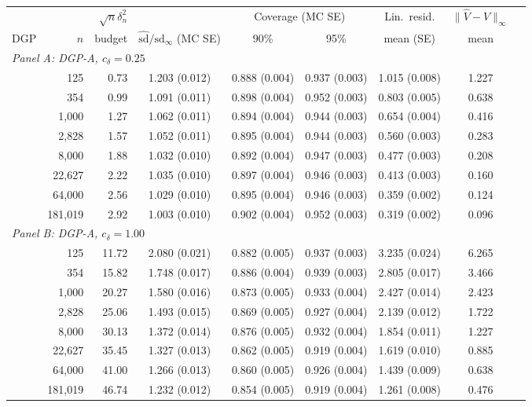 \begin{tabular}{lrrcccccc}
\toprule
 & & $\sqrt n\delta_n^2$ & & \multicolumn{2}{c}{Coverage (MC SE)} & Lin.\ resid. & $\|\hat V-V\|_\infty$ \\
\cmidrule(lr){5-6}
DGP & $n$ & budget & $\hat{\mathrm{sd}}/\mathrm{sd}_\infty$ (MC SE) & 90\% & 95\% & mean (SE) & mean \\
\midrule
\multicolumn{8}{l}{\textit{Panel A: DGP-A, $c_\delta=0.25$}} \\
\midrule
& 125 & 0.73 & 1.203 (0.012) & 0.888 (0.004) & 0.937 (0.003) & 1.015 (0.008) & 1.227 \\
& 354 & 0.99 & 1.091 (0.011) & 0.898 (0.004) & 0.952 (0.003) & 0.803 (0.005) & 0.638 \\
& 1,000 & 1.27 & 1.062 (0.011) & 0.894 (0.004) & 0.944 (0.003) & 0.654 (0.004) & 0.416 \\
& 2,828 & 1.57 & 1.052 (0.011) & 0.895 (0.004) & 0.944 (0.003) & 0.560 (0.003) & 0.283 \\
& 8,000 & 1.88 & 1.032 (0.010) & 0.892 (0.004) & 0.947 (0.003) & 0.477 (0.003) & 0.208 \\
& 22,627 & 2.22 & 1.035 (0.010) & 0.897 (0.004) & 0.946 (0.003) & 0.413 (0.003) & 0.160 \\
& 64,000 & 2.56 & 1.029 (0.010) & 0.895 (0.004) & 0.946 (0.003) & 0.359 (0.002) & 0.124 \\
& 181,019 & 2.92 & 1.003 (0.010) & 0.902 (0.004) & 0.952 (0.003) & 0.319 (0.002) & 0.096 \\
\multicolumn{8}{l}{\textit{Panel B: DGP-A, $c_\delta=1.00$}} \\
\midrule
& 125 & 11.72 & 2.080 (0.021) & 0.882 (0.005) & 0.937 (0.003) & 3.235 (0.024) & 6.265 \\
& 354 & 15.82 & 1.748 (0.017) & 0.886 (0.004) & 0.939 (0.003) & 2.805 (0.017) & 3.466 \\
& 1,000 & 20.27 & 1.580 (0.016) & 0.873 (0.005) & 0.933 (0.004) & 2.427 (0.014) & 2.423 \\
& 2,828 & 25.06 & 1.493 (0.015) & 0.869 (0.005) & 0.927 (0.004) & 2.139 (0.012) & 1.722 \\
& 8,000 & 30.13 & 1.372 (0.014) & 0.876 (0.005) & 0.932 (0.004) & 1.854 (0.011) & 1.227 \\
& 22,627 & 35.45 & 1.327 (0.013) & 0.862 (0.005) & 0.919 (0.004) & 1.619 (0.010) & 0.885 \\
& 64,000 & 41.00 & 1.266 (0.013) & 0.860 (0.005) & 0.926 (0.004) & 1.439 (0.009) & 0.638 \\
& 181,019 & 46.74 & 1.232 (0.012) & 0.854 (0.005) & 0.919 (0.004) & 1.261 (0.008) & 0.476 \\

\end{tabular}
